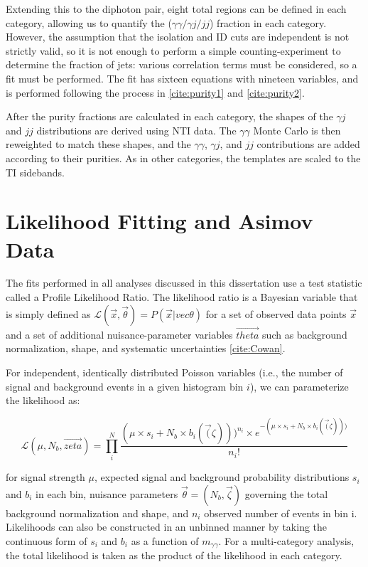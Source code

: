 Extending this to the diphoton pair, eight total regions can be defined in each category, allowing us to quantify the ($\gamma \gamma / \gamma j/jj$) fraction in each category. However, the assumption that the isolation and ID cuts are independent is not strictly valid, so it is not enough to perform a simple counting-experiment to determine the fraction of jets: various correlation terms must be considered, so a fit must be performed. The fit has sixteen equations with nineteen variables, and is performed following the process in \ref{cite:purity1} and \ref{cite:purity2}.

After the purity fractions are calculated in each category, the shapes of the $\gamma j$ and $jj$ distributions are derived using NTI data. The $\gamma \gamma$ Monte Carlo is then reweighted to match these shapes, and the $\gamma \gamma$, $\gamma j$, and $jj$ contributions are added according to their purities. As in other categories, the templates are scaled to the TI sidebands. 

\section{Likelihood Fitting and Asimov Data} \label{sec:likelihoodfit} 

The fits performed in all analyses discussed in this dissertation use a test statistic called a Profile Likelihood Ratio. The likelihood ratio  is a Bayesian variable that is simply defined as $\mathcal{L}(\vec{x},\vec{\theta}) = P(\vec{x} | vec{\theta})$  for a set of observed data points $\vec{x}$ and a set of additional nuisance-parameter variables $\vec{theta}$ such as background normalization, shape, and systematic uncertainties \ref{cite:Cowan}.

For independent, identically distributed Poisson variables (i.e., the number of signal and background events in a given histogram bin $i$), we can parameterize the likelihood as:

\begin{equation}
\mathcal{L}(\mu, N_{b}, \vec{zeta}) = \prod_{i}^{N}{\frac{(\mu \times s_{i}+ N_{b} \times b_{i}(\vec(\zeta)))^{n_{i}} \times e^{-(\mu \times s_{i}+ N_{b} \times b_{i}(\vec(\zeta))) }}{n_{i}!}}
\end{equation}

for signal strength $\mu$, expected signal and background probability distributions $s_{i}$ and $b_{i}$ in each bin, nuisance parameters $\vec{\theta} = (N_{b}, \vec{\zeta})$ governing the total background normalization and shape, and $n_{i}$ observed number of events in bin i. Likelihoods can also be constructed in an unbinned manner by taking the continuous form of $s_{i}$ and $b_{i}$ as a function of $m_{\gamma\gamma}$. For a multi-category analysis, the total likelihood is taken as the product of the likelihood in each category.

